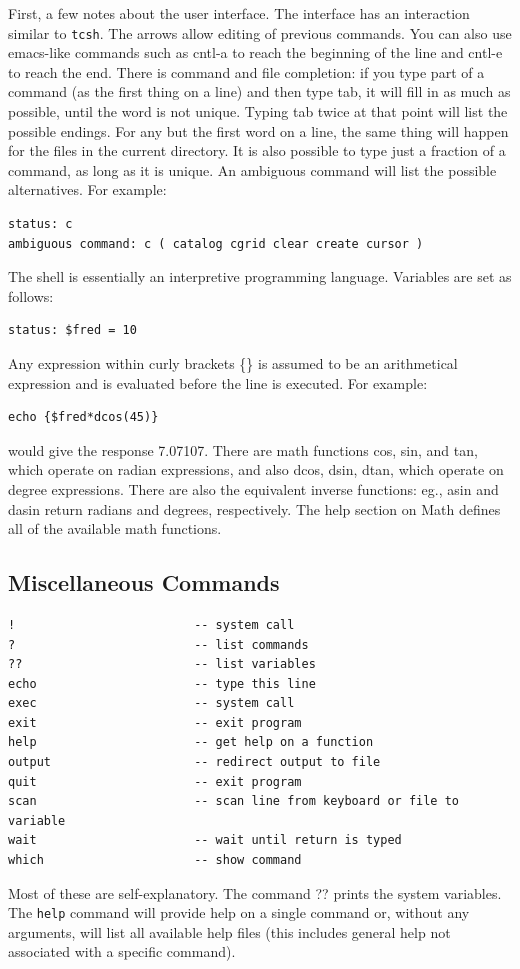 \documentclass{article}
\begin{document}
First, a few notes about the user interface.  The interface has an
interaction similar to {\tt tcsh}.  The arrows allow editing of
previous commands.  You can also use emacs-like commands such as
cntl-a to reach the beginning of the line and cntl-e to reach the end.
There is command and file completion: if you type part of a command
(as the first thing on a line) and then type tab, it will fill in as
much as possible, until the word is not unique.  Typing tab twice at
that point will list the possible endings.  For any but the first word
on a line, the same thing will happen for the files in the current
directory.  It is also possible to type just a fraction of a command,
as long as it is unique.  An ambiguous command will list the possible
alternatives.  For example:
\begin{verbatim}
status: c
ambiguous command: c ( catalog cgrid clear create cursor )
\end{verbatim}

The shell is essentially an interpretive programming language.
Variables are set as follows:
\begin{verbatim}
status: $fred = 10
\end{verbatim}
Any expression within curly brackets \{\} is assumed
to be an arithmetical expression and is evaluated before the line is
executed.  For example:
\begin{verbatim}
echo {$fred*dcos(45)}
\end{verbatim}
would give the response 7.07107.  There are math functions cos, sin,
and tan, which operate on radian expressions, and also dcos, dsin,
dtan, which operate on degree expressions.  There are also the
equivalent inverse functions: eg., asin and dasin return radians and
degrees, respectively.  The help section on Math defines all of the
available math functions.  

\subsection{Miscellaneous Commands}
\begin{verbatim}
!                         -- system call
?                         -- list commands 
??                        -- list variables 
echo                      -- type this line 
exec                      -- system call
exit                      -- exit program 
help                      -- get help on a function 
output                    -- redirect output to file
quit                      -- exit program 
scan                      -- scan line from keyboard or file to variable 
wait                      -- wait until return is typed
which                     -- show command 
\end{verbatim}
Most of these are self-explanatory.  The command ?? prints the system
variables.  The {\tt help} command will provide help on a single
command or, without any arguments, will list all available help
files (this includes general help not associated with a specific
command).  
\end{document}
